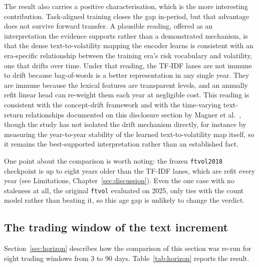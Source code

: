 \documentclass[logo,msc,ai]{infthesis}        %
\begin{document}
The result also carries a positive characterisation, which is the more interesting contribution. Task-aligned training closes the gap in-period, but that advantage does not survive forward transfer. A plausible reading, offered as an interpretation the evidence supports rather than a demonstrated mechanism, is that the dense text-to-volatility mapping the encoder learns is consistent with an era-specific relationship between the training era's risk vocabulary and volatility, one that drifts over time. Under that reading, the TF-IDF lanes are not immune to drift because bag-of-words is a better representation in any single year. They are immune because the lexical features are transparent levels, and an annually refit linear head can re-weight them each year at negligible cost. This reading is consistent with the concept-drift framework \cite{lu2018learning} and with the time-varying text-return relationships documented on this disclosure section by Magner et al.\ \cite{magner2025decoding}, though the study has not isolated the drift mechanism directly, for instance by measuring the year-to-year stability of the learned text-to-volatility map itself, so it remains the best-supported interpretation rather than an established fact.

One point about the comparison is worth noting: the frozen \texttt{ftvol2018} checkpoint is up to eight years older than the TF-IDF lanes, which are refit every year (see Limitations, Chapter~\ref{sec:discussion}). Even the one case with no staleness at all, the original \texttt{ftvol} evaluated on 2025, only ties with the count model rather than beating it, so this age gap is unlikely to change the verdict.

\subsection{The trading window of the text increment}
\label{sec:results-horizon}
Section~\ref{sec:horizon} describes how the comparison of this section was re-run for eight trading windows from 3 to 90 days. Table~\ref{tab:horizon} reports the result.
\end{document}
